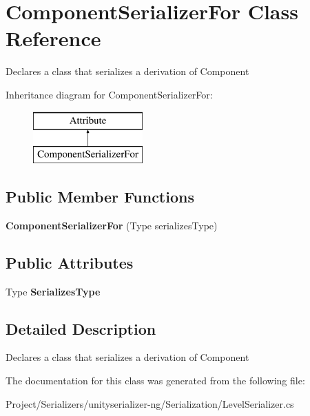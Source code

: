 \hypertarget{class_component_serializer_for}{}\section{Component\+Serializer\+For Class Reference}
\label{class_component_serializer_for}


Declares a class that serializes a derivation of Component  


Inheritance diagram for Component\+Serializer\+For\+:\begin{figure}[H]
\begin{center}
\leavevmode
\includegraphics[height=2.000000cm]{class_component_serializer_for}
\end{center}
\end{figure}
\subsection*{Public Member Functions}
\begin{DoxyCompactItemize}
\item 
\mbox{\label{class_component_serializer_for_a3a972befbb46f38eb0cff0efe4081476}} 
{\bfseries Component\+Serializer\+For} (Type serializes\+Type)
\end{DoxyCompactItemize}
\subsection*{Public Attributes}
\begin{DoxyCompactItemize}
\item 
\mbox{\label{class_component_serializer_for_a1f14524b26bf8afa0679193bda8124bf}} 
Type {\bfseries Serializes\+Type}
\end{DoxyCompactItemize}


\subsection{Detailed Description}
Declares a class that serializes a derivation of Component 



The documentation for this class was generated from the following file\+:\begin{DoxyCompactItemize}
\item 
Project/\+Serializers/unityserializer-\/ng/\+Serialization/Level\+Serializer.\+cs\end{DoxyCompactItemize}
